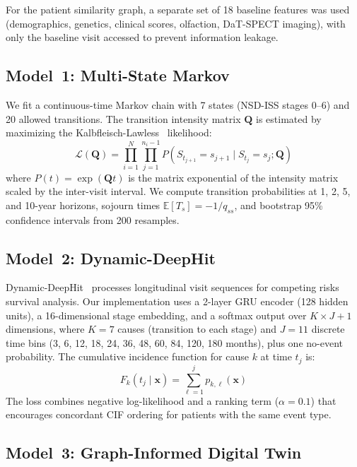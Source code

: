 For the patient similarity graph, a separate set of 18 baseline features was used (demographics, genetics, clinical scores, olfaction, DaT-SPECT imaging), with only the baseline visit accessed to prevent information leakage.

\subsection{Model~1: Multi-State Markov}
\label{p3:sec:markov}

We fit a continuous-time Markov chain with 7 states (NSD-ISS stages 0--6) and 20 allowed transitions. The transition intensity matrix $\mathbf{Q}$ is estimated by maximizing the Kalbfleisch-Lawless~\cite{kalbfleisch1985} likelihood:
\begin{equation}
    \mathcal{L}(\mathbf{Q}) = \prod_{i=1}^{N} \prod_{j=1}^{n_i - 1} P(S_{t_{j+1}} = s_{j+1} \mid S_{t_j} = s_j; \mathbf{Q})
\end{equation}
where $P(t) = \exp(\mathbf{Q} t)$ is the matrix exponential of the intensity matrix scaled by the inter-visit interval. We compute transition probabilities at 1, 2, 5, and 10-year horizons, sojourn times $\mathbb{E}[T_s] = -1/q_{ss}$, and bootstrap 95\% confidence intervals from 200 resamples.

\subsection{Model~2: Dynamic-DeepHit}
\label{p3:sec:deephit}

Dynamic-DeepHit~\cite{lee2019} processes longitudinal visit sequences for competing risks survival analysis. Our implementation uses a 2-layer GRU encoder (128 hidden units), a 16-dimensional stage embedding, and a softmax output over $K \times J + 1$ dimensions, where $K{=}7$ causes (transition to each stage) and $J{=}11$ discrete time bins (3, 6, 12, 18, 24, 36, 48, 60, 84, 120, 180 months), plus one no-event probability. The cumulative incidence function for cause $k$ at time $t_j$ is:
\begin{equation}
    F_k(t_j \mid \mathbf{x}) = \sum_{\ell=1}^{j} p_{k,\ell}(\mathbf{x})
\end{equation}
The loss combines negative log-likelihood and a ranking term ($\alpha{=}0.1$) that encourages concordant CIF ordering for patients with the same event type.

\subsection{Model~3: Graph-Informed Digital Twin}
\label{p3:sec:graphdt}

